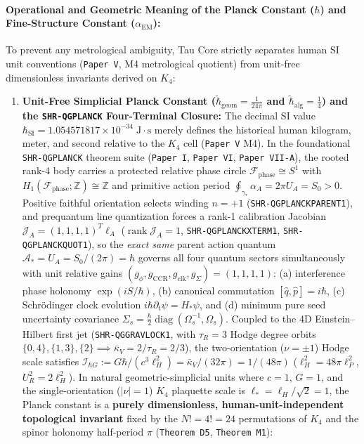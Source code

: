 \documentclass[11pt,a4paper]{article}
\begin{document}
\paragraph{Operational and Geometric Meaning of the Planck Constant ($\hbar$) and Fine-Structure Constant ($\alpha_{\mathrm{EM}}$):}
To prevent any metrological ambiguity, Tau Core strictly separates human SI unit conventions (\texttt{Paper V}, M4 metrological quotient) from unit-free dimensionless invariants derived on $K_4$:
\begin{enumerate}[label=(\roman*),leftmargin=1.8em,itemsep=2pt]
\item \textbf{Unit-Free Simplicial Planck Constant ($\tilde{\hbar}_{\mathrm{geom}} = \frac{1}{24\pi}$ and $\tilde{\hbar}_{\mathrm{alg}} = \frac{1}{4}$) and the \texttt{SHR-QGPLANCK} Four-Terminal Closure:} The decimal SI value $\hbar_{\mathrm{SI}} = 1.054571817\times 10^{-34}\;\mathrm{J\cdot s}$ merely defines the historical human kilogram, meter, and second relative to the $K_4$ cell (\texttt{Paper V} M4). In the foundational \texttt{SHR-QGPLANCK} theorem suite (\texttt{Paper I}, \texttt{Paper VI}, \texttt{Paper VII-A}), the rooted rank-4 body carries a protected relative phase circle $\mathcal{F}_{\mathrm{phase}}\cong S^1$ with $H_1(\mathcal{F}_{\mathrm{phase}};\mathbb{Z})\cong\mathbb{Z}$ and primitive action period $\oint_{\gamma_*}\alpha_A = 2\pi U_A = S_0 > 0$. Positive faithful orientation selects winding $n=+1$ (\texttt{SHR-QGPLANCKPARENT1}), and prequantum line quantization forces a rank-1 calibration Jacobian $\mathcal{J}_A=(1,1,1,1)^T\ell_A$ ($\operatorname{rank}\mathcal{J}_A=1$, \texttt{SHR-QGPLANCKXTERM1}, \texttt{SHR-QGPLANCKQUOT1}), so the \emph{exact same} parent action quantum $\mathcal{A}_*=U_A=S_0/(2\pi)=\hbar$ governs all four quantum sectors simultaneously with unit relative gains $(g_\phi,g_{\mathrm{CCR}},g_{\mathrm{clk}},g_\Sigma)=(1,1,1,1)$: (a) interference phase holonomy $\exp(iS/\hbar)$, (b) canonical commutation $[\hat{q},\hat{p}]=i\hbar$, (c) Schr\"odinger clock evolution $i\hbar\partial_t\psi=H_*\psi$, and (d) minimum pure seed uncertainty covariance $\Sigma_s=\frac{\hbar}{2}\operatorname{diag}(\Omega_s^{-1},\Omega_s)$. Coupled to the 4D Einstein--Hilbert first jet (\texttt{SHR-QGGRAVLOCK1}, with $\tau_R=3$ Hodge degree orbits $\{0,4\},\{1,3\},\{2\}\implies\bar{\kappa}_V=2/\tau_R=2/3$), the two-orientation ($\nu=\pm 1$) Hodge scale satisfies $\mathcal{I}_{\hbar G}:=G\hbar/(c^3\ell_H^2)=\bar{\kappa}_V/(32\pi)=1/(48\pi)$ ($\ell_H^2=48\pi\ell_P^2$, $U_R^2=2\ell_H^2$). In natural geometric-simplicial units where $c = 1$, $G = 1$, and the single-orientation ($|\nu|=1$) $K_4$ plaquette scale is $\ell_* = \ell_H/\sqrt{2} = 1$, the Planck constant is a \textbf{purely dimensionless, human-unit-independent topological invariant} fixed by the $N! = 4! = 24$ permutations of $K_4$ and the spinor holonomy half-period $\pi$ (\texttt{Theorem D5}, \texttt{Theorem M1}):

\end{enumerate}
\end{document}
